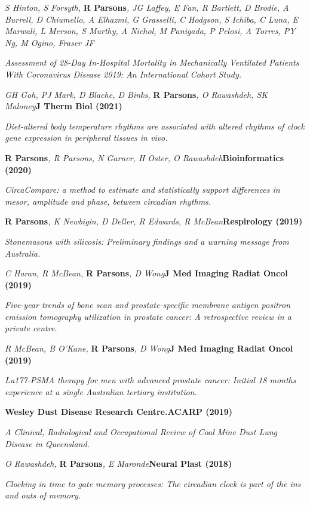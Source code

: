 	\textit{S Hinton, S Forsyth, }\textbf{R Parsons}\textit{, JG Laffey, E Fan, R Bartlett, D Brodie, A Burrell, D Chiumello, A Elhazmi, G Grasselli, C Hodgson, S Ichiba, C Luna, E Marwali, L Merson, S Murthy, A Nichol, M Panigada, P Pelosi, A Torres, PY Ng, M Ogino, Fraser JF}\par
    \textit{Assessment of 28-Day In-Hospital Mortality in Mechanically Ventilated Patients With Coronavirus Disease 2019: An International Cohort Study.}
\item
    \textit{GH Goh, PJ Mark, D Blache, D Binks, }\textbf{R Parsons}\textit{, O Rawashdeh, SK Maloney}\textbf{\hfill J Therm Biol (2021)}\par 
    \textit{Diet-altered body temperature rhythms are associated with altered rhythms of clock gene expression in peripheral tissues in vivo.}
\item
    \textbf{R Parsons}\textit{, R Parsons, N Garner, H Oster, O Rawashdeh}\textbf{\hfill Bioinformatics (2020)}\par 
    \textit{CircaCompare: a method to estimate and statistically support differences in mesor, amplitude and phase, between circadian rhythms.}
\item
    \textbf{R Parsons}\textit{, K Newbigin, D Deller, R Edwards, R McBean}\textbf{\hfill Respirology (2019)}\par 
    \textit{Stonemasons with silicosis: Preliminary findings and a warning message from Australia.}
\item
    \textit{C Haran, R McBean, }\textbf{R Parsons}\textit{, D Wong}\textbf{\hfill J Med Imaging Radiat Oncol (2019)}\par 
    \textit{Five-year trends of bone scan and prostate-specific membrane antigen positron emission tomography utilization in prostate cancer: A retrospective review in a private centre.}
\item
    \textit{R McBean, B O'Kane, }\textbf{R Parsons}\textit{, D Wong}\textbf{\hfill J Med Imaging Radiat Oncol (2019)}\par 
    \textit{Lu177‐PSMA therapy for men with advanced prostate cancer: Initial 18 months experience at a single Australian tertiary institution.}
\item
    \textbf{Wesley Dust Disease Research Centre.}\textbf{\hfill ACARP (2019)}\par 
    \textit{A Clinical, Radiological and Occupational Review of Coal Mine Dust Lung Disease in Queensland.}
\item
    \textit{O Rawashdeh, }\textbf{R Parsons}\textit{, E Maronde}\textbf{\hfill Neural Plast (2018)}\par 
    \textit{Clocking in time to gate memory processes: The circadian clock is part of the ins and outs of memory.}
